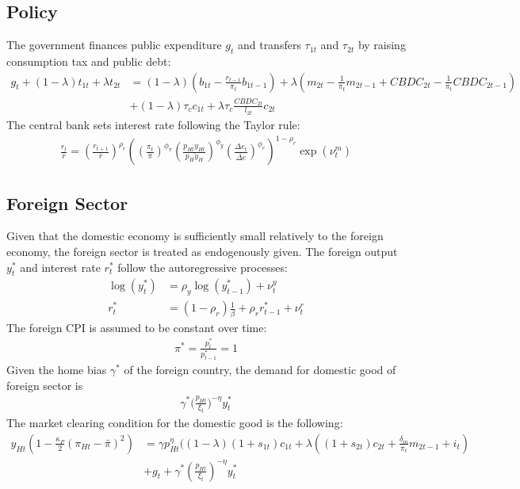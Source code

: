 \documentclass[12pt]{article}
\begin{document}
\subsection{Policy}
The government finances public expenditure $g_t$ and transfers $\tau_{1t}$ and $\tau_{2t}$ by raising consumption tax and public debt:
\begin{align*}
g_t + (1-\lambda)t_{1t}+\lambda t_{2t} &= (1-\lambda)(b_{1t}-\frac{r_{t-1}}{\pi_t}b_{1t-1})+\lambda(m_{2t}-\frac{1}{\pi_t} m_{2t-1}+CBDC_{2t}-\frac{1}{\pi_t} CBDC_{2t-1} ) \\
& + (1-\lambda)\tau_c c_{1t} +\lambda\tau_c\frac{CBDC_{2t}}{l_{2t}}c_{2t}
\end{align*}
The central bank sets interest rate following the Taylor rule: 
\begin{align*}
\frac{r_t}{\bar{r}} = (\frac{r_{t+1}}{\bar{r}})^{\rho_r}((\frac{\pi_t}{\bar{\pi}} )^{\phi_{\pi}} (\frac{p_{Ht}y_{Ht}}{\bar{p_Hy_H}})^{\phi_y} (\frac{\Delta e_t}{\bar{\Delta e}})^{\phi_e})^{1-\rho_r}\exp(\nu_t^m)
\end{align*}

\subsection{Foreign Sector}
Given that the domestic economy is sufficiently small relatively to the foreign economy, the foreign sector is treated as endogenously given. The foreign output $y_t^*$ and interest rate $r_t^*$ follow the autoregressive processes: 
\begin{align*}
\log(y_t^*) &= \rho_y\log(y_{t-1}^*)+\nu_t^y \\
r_t^*&= (1-\rho_r)\frac{1}{\beta}+\rho_rr_{t-1}^*+\nu_t^r 
\end{align*}
The foreign CPI is assumed to be constant over time:
\begin{align*}
\pi^* = \frac{p_t^*}{p_{t-1}^*} = 1
\end{align*}
Given the home bias $\gamma^*$ of the foreign country, the demand for domestic good of foreign sector is 
\begin{align*}
\gamma^*\Big(\frac{p_{Ht}}{\xi_t}\Big)^{-\eta}y_t^*
\end{align*}
The market clearing condition for the domestic good is the following:
\begin{align*}
y_{Ht}(1-\frac{\kappa_P}{2}(\pi_{Ht}-\bar{\pi})^2) &= \gamma p_{Ht}^{\eta}((1-\lambda)(1+s_{1t})c_{1t}+\lambda((1+s_{2t})c_{2t}+\frac{\delta_m}{\pi_t}m_{2t-1}+i_t) \\
&+g_t+\gamma^*(\frac{p_{Ht}}{\xi_t})^{-\eta}y_t^*
\end{align*}
\end{document}
